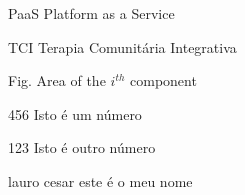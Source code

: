 \begin{siglas}
  \item[PaaS] Platform as a Service
  \item[TCI] Terapia Comunitária Integrativa
  \item[Fig.] Area of the $i^{th}$ component
  \item[456] Isto é um número
  \item[123] Isto é outro número
  \item[lauro cesar] este é o meu nome
\end{siglas}
